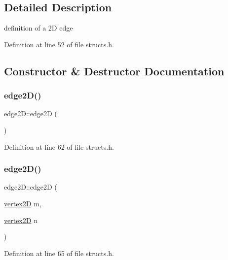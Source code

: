 \subsection{Detailed Description}
definition of a 2D edge 

Definition at line 52 of file structs.\+h.



\subsection{Constructor \& Destructor Documentation}
\mbox{\label{structedge2_d_abac488760a745ba14a5a0c17693ed3e6}} 
\subsubsection{\texorpdfstring{edge2\+D()}{edge2D()}\hspace{0.1cm}{\footnotesize\ttfamily [1/2]}}
{\footnotesize\ttfamily edge2\+D\+::edge2D (\begin{DoxyParamCaption}{ }\end{DoxyParamCaption})\hspace{0.3cm}{\ttfamily [inline]}}



Definition at line 62 of file structs.\+h.

\mbox{\label{structedge2_d_a95676d1bf3e35fbae3ce28a9497c643c}} 
\subsubsection{\texorpdfstring{edge2\+D()}{edge2D()}\hspace{0.1cm}{\footnotesize\ttfamily [2/2]}}
{\footnotesize\ttfamily edge2\+D\+::edge2D (\begin{DoxyParamCaption}\item[{\mbox{\hyperlink{structvertex2_d}{vertex2D}}}]{m,  }\item[{\mbox{\hyperlink{structvertex2_d}{vertex2D}}}]{n }\end{DoxyParamCaption})\hspace{0.3cm}{\ttfamily [inline]}}



Definition at line 65 of file structs.\+h.



